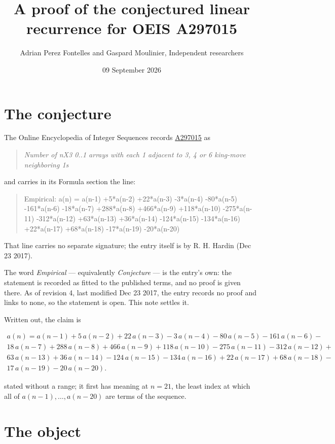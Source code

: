 \documentclass[11pt]{article}
\title{A proof of the conjectured linear recurrence for OEIS A297015}
\author{Adrian Perez Fontelles and Gaspard Moulinier, Independent researchers}
\date{09 September 2026}
\theoremstyle{definition}
\begin{document}
\maketitle
\section{The conjecture}

The Online Encyclopedia of Integer Sequences records \href{https://oeis.org/A297015}{A297015} as

\begin{quote}\itshape Number of nX3 0..1 arrays with each 1 adjacent to 3, 4 or 6 king-move neighboring 1s\end{quote}

and carries in its Formula section the line:

\begin{quote}\ttfamily Empirical: a(n) = a(n-1) +5*a(n-2) +22*a(n-3) -3*a(n-4) -80*a(n-5) -161*a(n-6) -18*a(n-7) +288*a(n-8) +466*a(n-9) +118*a(n-10) -275*a(n-11) -312*a(n-12) +63*a(n-13) +36*a(n-14) -124*a(n-15) -134*a(n-16) +22*a(n-17) +68*a(n-18) -17*a(n-19) -20*a(n-20)\end{quote}

That line carries no separate signature; the entry itself is by R. H. Hardin (Dec 23 2017).

The word {\itshape Empirical} --- equivalently {\itshape Conjecture} --- is the entry's own: the statement is recorded as fitted to the published terms, and no proof is given there. As of revision 4, last modified Dec 23 2017, the entry records no proof and links to none, so the statement is open. This note settles it.

Written out, the claim is

\begin{multline*} a(n) = a(n-1) + 5\,a(n-2) + 22\,a(n-3) - 3\,a(n-4) - 80\,a(n-5) - 161\,a(n-6) - \\ 18\,a(n-7) + 288\,a(n-8) + 466\,a(n-9) + 118\,a(n-10) - 275\,a(n-11) - 312\,a(n-12) + \\ 63\,a(n-13) + 36\,a(n-14) - 124\,a(n-15) - 134\,a(n-16) + 22\,a(n-17) + 68\,a(n-18) - \\ 17\,a(n-19) - 20\,a(n-20). \end{multline*}

stated without a range; it first has meaning at $n = 21$, the least index at which all of $a(n-1),\dots,a(n-20)$ are terms of the sequence.

\section{The object}
\end{document}
